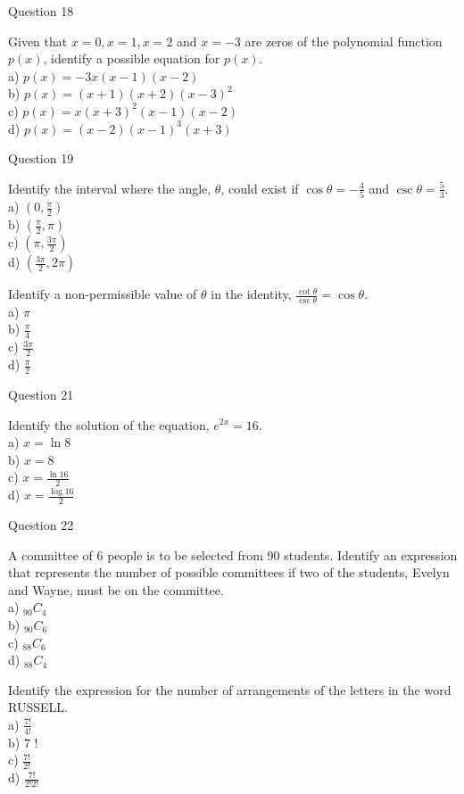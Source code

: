 \documentclass[10pt]{article}
\begin{document}
Question 18

Given that $x=0, x=1, x=2$ and $x=-3$ are zeros of the polynomial function $p(x)$, identify a possible equation for $p(x)$.\\
a) $p(x)=-3 x(x-1)(x-2)$\\
b) $p(x)=(x+1)(x+2)(x-3)^{2}$\\
c) $p(x)=x(x+3)^{2}(x-1)(x-2)$\\
d) $p(x)=(x-2)(x-1)^{3}(x+3)$

Question 19

Identify the interval where the angle, $\theta$, could exist if $\cos \theta=-\frac{4}{5}$ and $\csc \theta=\frac{5}{3}$.\\
a) $\left(0, \frac{\pi}{2}\right)$\\
b) $\left(\frac{\pi}{2}, \pi\right)$\\
c) $\left(\pi, \frac{3 \pi}{2}\right)$\\
d) $\left(\frac{3 \pi}{2}, 2 \pi\right)$

Identify a non-permissible value of $\theta$ in the identity, $\frac{\cot \theta}{\csc \theta}=\cos \theta$.\\
a) $\pi$\\
b) $\frac{\pi}{4}$\\
c) $\frac{3 \pi}{2}$\\
d) $\frac{\pi}{2}$

Question 21

Identify the solution of the equation, $e^{2 x}=16$.\\
a) $x=\ln 8$\\
b) $x=8$\\
c) $x=\frac{\ln 16}{2}$\\
d) $x=\frac{\log 16}{2}$

Question 22

A committee of 6 people is to be selected from 90 students. Identify an expression that represents the number of possible committees if two of the students, Evelyn and Wayne, must be on the committee.\\
a) ${ }_{90} C_{4}$\\
b) ${ }_{90} C_{6}$\\
c) ${ }_{88} C_{6}$\\
d) ${ }_{88} C_{4}$

Identify the expression for the number of arrangements of the letters in the word RUSSELL.\\
a) $\frac{7!}{4!}$\\
b) 7 !\\
c) $\frac{7!}{2!}$\\
d) $\frac{7!}{2!2!}$
\end{document}
